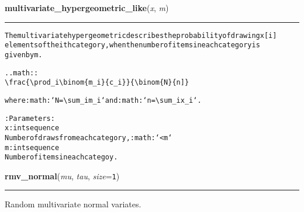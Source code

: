     \begin{boxedminipage}{\textwidth}

    \raggedright \textbf{multivariate\_hypergeometric\_like}(\textit{x}, \textit{m})

    \vspace{-1.5ex}

    \rule{\textwidth}{0.5\fboxrule}
\begin{alltt}
The multivariate hypergeometric describes the probability of drawing x[i] 
elements of the ith category, when the number of items in each category is
given by m. 


.. math::
    {\textbackslash}frac\{{\textbackslash}prod\_i {\textbackslash}binom\{m\_i\}\{c\_i\}\}\{{\textbackslash}binom\{N\}\{n]\}

where :math:`N = {\textbackslash}sum\_i m\_i` and :math:`n = {\textbackslash}sum\_i x\_i`.

:Parameters:
    x : int sequence
        Number of draws from each category, :math:`{\textless} m`
    m : int sequence
        Number of items in each categoy. 
\end{alltt}

    \vspace{1ex}

    \end{boxedminipage}

    \label{pymc:distributions:rmv_normal}

    \vspace{0.5ex}

    \begin{boxedminipage}{\textwidth}

    \raggedright \textbf{rmv\_normal}(\textit{mu}, \textit{tau}, \textit{size}=\texttt{1})

    \vspace{-1.5ex}

    \rule{\textwidth}{0.5\fboxrule}

Random multivariate normal variates.
    \vspace{1ex}

    \end{boxedminipage}

    \label{pymc:distributions:mv_normal_expval}

